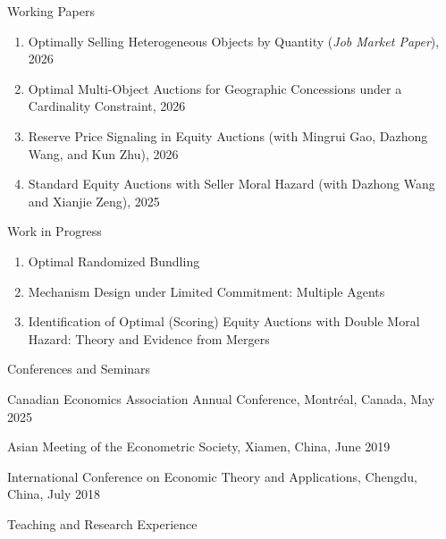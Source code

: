 \documentclass[10pt,letterpaper]{article}
\newcommand{\cvsection}[1]{%
    \par\addvspace{20pt}
    \needspace{4\baselineskip}
    {\fontsize{14.4}{18}\selectfont #1\par}
    \vspace{10pt}
}
\newenvironment{cventries}
{\begin{list}{}{%
    \setlength{\leftmargin}{1.5em}
    \setlength{\rightmargin}{0pt}
    \setlength{\itemsep}{8pt}
    \setlength{\parsep}{0pt}
    \setlength{\topsep}{0pt}
}}
{\end{list}}
\begin{document}
\cvsection{Working Papers}

\begin{enumerate}

\item Optimally Selling Heterogeneous Objects by Quantity (\textit{Job Market Paper}), 2026

\item Optimal Multi-Object Auctions for Geographic Concessions under a Cardinality Constraint, 2026

\item Reserve Price Signaling in Equity Auctions (with Mingrui Gao, Dazhong Wang, and Kun Zhu), 2026

\item Standard Equity Auctions with Seller Moral Hazard (with Dazhong Wang and Xianjie Zeng), 2025

\end{enumerate}

\cvsection{Work in Progress}

\begin{enumerate}

\item Optimal Randomized Bundling

\item Mechanism Design under Limited Commitment: Multiple Agents

\item Identification of Optimal (Scoring) Equity Auctions with Double Moral Hazard: Theory and Evidence from Mergers

\end{enumerate}

\newpage

\cvsection{Conferences and Seminars}

\begin{cventries}

\item Canadian Economics Association Annual Conference, Montr\'eal, Canada, May 2025

\item Asian Meeting of the Econometric Society, Xiamen, China, June 2019

\item International Conference on Economic Theory and Applications, Chengdu, China, July 2018

\end{cventries}

\cvsection{Teaching and Research Experience}
\end{document}
